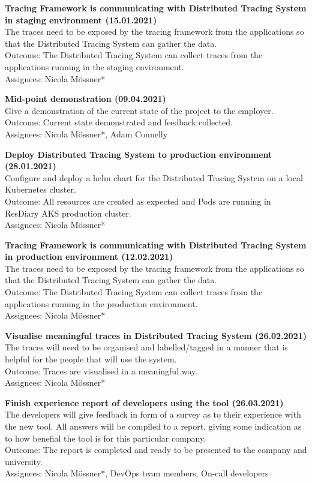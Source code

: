 \documentclass[11pt]{article}
\begin{document}
\textbf{Tracing Framework is communicating with Distributed Tracing System in staging environment (15.01.2021)}\\
The traces need to be exposed by the tracing framework from the applications so that the Distributed Tracing System can gather the data.\\
Outcome: The Distributed Tracing System can collect traces from the applications running in the staging environment.\\
Assignees: Nicola M\"{o}ssner*

\textbf{Mid-point demonstration (09.04.2021)}\\
Give a demonstration of the current state of the project to the employer.\\
Outcome: Current state demonstrated and feedback collected.\\
Assignees: Nicola M\"{o}ssner*, Adam Connelly

\textbf{Deploy Distributed Tracing System to production environment (28.01.2021)}\\
Configure and deploy a helm chart for the Distributed Tracing System on a local Kubernetes cluster.\\
Outcome: All resources are created as expected and Pods are running in ResDiary AKS production cluster.\\
Assignees: Nicola M\"{o}ssner*

\textbf{Tracing Framework is communicating with Distributed Tracing System in production environment (12.02.2021)}\\
The traces need to be exposed by the tracing framework from the applications so that the Distributed Tracing System can gather the data.\\
Outcome: The Distributed Tracing System can collect traces from the applications running in the production environment.\\
Assignees: Nicola M\"{o}ssner*

\textbf{Visualise meaningful traces in Distributed Tracing System (26.02.2021)}\\
The traces will need to be organised and labelled/tagged in a manner that is helpful for the people that will use the system.\\
Outcome: Traces are visualised in a meaningful way.\\
Assignees: Nicola M\"{o}ssner*

\textbf{Finish experience report of developers using the tool (26.03.2021)}\\
The developers will give feedback in form of a survey as to their experience with the new tool. All answers will be compiled to a report, giving some indication as to how benefial the tool is for this particular company.\\
Outcome: The report is completed and ready to be presented to the company and university.\\
Assignees: Nicola M\"{o}ssner*, DevOps team members, On-call developers
\end{document}
